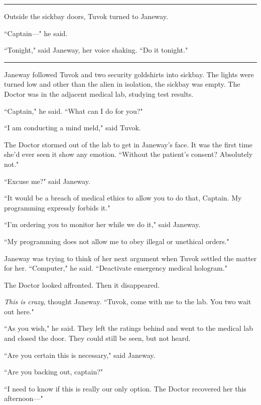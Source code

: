 \documentclass[twoside,letterpaper,12pt]{memoir}
\begin{document}
\begin{center}\rule{3cm}{0.4 pt}\end{center} 

Outside the sickbay doors, Tuvok turned to Janeway. 

``Captain---" he said. 

``Tonight," said Janeway, her voice shaking. ``Do it tonight." 

\begin{center}\rule{3cm}{0.4 pt}\end{center} 

Janeway followed Tuvok and two security goldshirts into sickbay. The lights were turned low and other than the alien in isolation, the sickbay was empty. The Doctor was in the adjacent medical lab, studying test results. 

``Captain," he said. ``What can I do for you?" 

``I am conducting a mind meld," said Tuvok. 

The Doctor stormed out of the lab to get in Janeway's face. It was the first time she'd ever seen it show any emotion. ``Without the patient's consent? Absolutely not." 

``Excuse me?" said Janeway. 

``It would be a breach of medical ethics to allow you to do that, Captain. My programming expressly forbids it." 

``I'm ordering you to monitor her while we do it," said Janeway. 

``My programming does not allow me to obey illegal or unethical orders." 

Janeway was trying to think of her next argument when Tuvok settled the matter for her. ``Computer," he said. ``Deactivate emergency medical hologram." 

The Doctor looked affronted. Then it disappeared. 

\textit{This is crazy}, thought Janeway. ``Tuvok, come with me to the lab. You two wait out here." 

``As you wish," he said. They left the ratings behind and went to the medical lab and closed the door. They could still be seen, but not heard. 

``Are you certain this is necessary," said Janeway. 

``Are you backing out, captain?" 

“I need to know if this is really our only option. The Doctor recovered her this afternoon---" 
\end{document}
